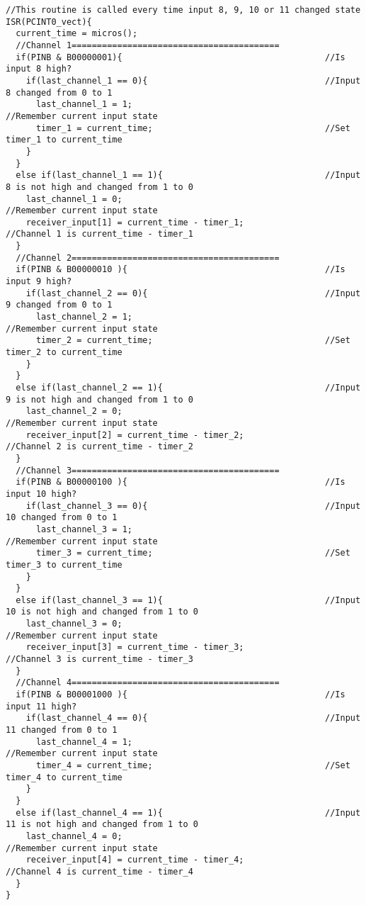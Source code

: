 \begin{lstlisting}
//This routine is called every time input 8, 9, 10 or 11 changed state
ISR(PCINT0_vect){
  current_time = micros();
  //Channel 1=========================================
  if(PINB & B00000001){                                        //Is input 8 high?
    if(last_channel_1 == 0){                                   //Input 8 changed from 0 to 1
      last_channel_1 = 1;                                      //Remember current input state
      timer_1 = current_time;                                  //Set timer_1 to current_time
    }
  }
  else if(last_channel_1 == 1){                                //Input 8 is not high and changed from 1 to 0
    last_channel_1 = 0;                                        //Remember current input state
    receiver_input[1] = current_time - timer_1;                 //Channel 1 is current_time - timer_1
  }
  //Channel 2=========================================
  if(PINB & B00000010 ){                                       //Is input 9 high?
    if(last_channel_2 == 0){                                   //Input 9 changed from 0 to 1
      last_channel_2 = 1;                                      //Remember current input state
      timer_2 = current_time;                                  //Set timer_2 to current_time
    }
  }
  else if(last_channel_2 == 1){                                //Input 9 is not high and changed from 1 to 0
    last_channel_2 = 0;                                        //Remember current input state
    receiver_input[2] = current_time - timer_2;                 //Channel 2 is current_time - timer_2
  }
  //Channel 3=========================================
  if(PINB & B00000100 ){                                       //Is input 10 high?
    if(last_channel_3 == 0){                                   //Input 10 changed from 0 to 1
      last_channel_3 = 1;                                      //Remember current input state
      timer_3 = current_time;                                  //Set timer_3 to current_time
    }
  }
  else if(last_channel_3 == 1){                                //Input 10 is not high and changed from 1 to 0
    last_channel_3 = 0;                                        //Remember current input state
    receiver_input[3] = current_time - timer_3;                 //Channel 3 is current_time - timer_3
  }
  //Channel 4=========================================
  if(PINB & B00001000 ){                                       //Is input 11 high?
    if(last_channel_4 == 0){                                   //Input 11 changed from 0 to 1
      last_channel_4 = 1;                                      //Remember current input state
      timer_4 = current_time;                                  //Set timer_4 to current_time
    }
  }
  else if(last_channel_4 == 1){                                //Input 11 is not high and changed from 1 to 0
    last_channel_4 = 0;                                        //Remember current input state
    receiver_input[4] = current_time - timer_4;                 //Channel 4 is current_time - timer_4
  }
}


\end{lstlisting}

